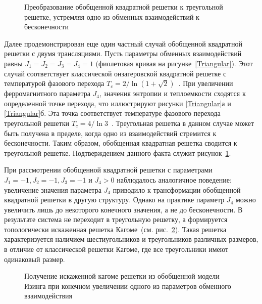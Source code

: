 \documentclass[utf8,12pt]{jetp}
\begin{document}
\begin{figure}[h]
	\caption{Преобразование обобщенной квадратной решетки к треугольной решетке, устремляя одно из обменных взаимодействий к бесконечности}
	\label{triag}
\end{figure}

Далее продемонстрирован еще один частный случай обобщенной квадратной решетки с двумя трансляциями. Пусть параметры обменных взаимодействий равны $J_1 = J_2 = J_3 = J_4 = 1$ (фиолетовая кривая на рисунке~\ref{Triangular}). Этот случай соответствует классической онзагеровской квадратной решетке с температурой фазового перехода $T_c = 2/\ln (1+\sqrt{2})$~\cite{kramers_wannier1, kramers_wannier2}. При увеличении ферромагнитного параметра $J_4$, значения энтропии и теплоемкости сходятся к определенной точке перехода, что иллюстрируют рисунки \ref{Triangular}а и \ref{Triangular}б. Эта точка соответствует температуре фазового перехода треугольной решетки $T_c = 4/\ln 3$~\cite{wannier1950}. Треугольная решетка в данном случае может быть получена в пределе, когда одно из взаимодействий стремится к бесконечности. Таким образом, обобщенная квадратная решетка сводится к треугольной решетке. Подтверждением данного факта служит рисунок~\ref{triag}. 

При рассмотрении обобщенной квадратной решетки с параметрами $J_1 = -1, J_2 = -1, J_3 = -1$ и $J_4 > 0$ наблюдалось аналогичное поведение: увеличение значения параметра $J_4$ приводило к трансформации обобщенной квадратной решетки в другую структуру. Однако на практике параметр $J_4$ можно увеличить лишь до некоторого конечного значения, а не до бесконечности. В результате система не переходит в треугольную решетку, а формируется топологически искаженная решетка Кагоме~(см. рис.~\ref{kagomelike}). Такая решетка характеризуется наличием шестиугольников и треугольников различных размеров, в отличие от классической решетки Кагоме, где все треугольники имеют одинаковый размер. 

\begin{figure}[h]
	\caption{Получение искаженной кагоме решетки из обобщенной модели Изинга при конечном увеличении одного из параметров обменного взаимодействия}
	\label{kagomelike}
\end{figure}
\end{document}
